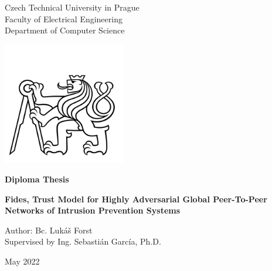 

\begin{titlepage}
    \begin{center}
        
        \LARGE
        Czech Technical University in Prague\\
        Faculty of Electrical Engineering\\
        Department of Computer Science
        
        \includegraphics[width=0.4\textwidth]{assets/ctu_blackwhite.jpg}

        \Large
        \textbf{Diploma Thesis}
        
        \vfill
        
        \vspace*{0.5cm}
        \LARGE
        \textbf{Fides, Trust Model for Highly Adversarial Global Peer-To-Peer Networks of Intrusion Prevention Systems}
        

        \vfill

        \large
        Author: Bc. Lukáš Forst \\
        Supervised by Ing. Sebastián García, Ph.D.
        
        \vspace{0.8cm}

        \Large
        May 2022

    \end{center}
\end{titlepage}

\thispagestyle{empty}
\cleardoublepage